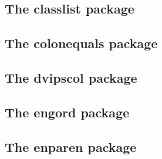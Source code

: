 \documentclass[a4paper,12pt]{article}
\makeatletter
\newcommand*{\xpackage}[1]{\textsf{#1}}
\newcommand*{\xfile}[1]{\texttt{#1}}
\newcommand*{\tocinclude}[1]{%
  \setcounter{tocdepth}{3}%
  \begingroup
    \makeatletter
    \def\@prj{#1}%
    \let\contentsline\foreign@contentsline
  \endgroup
}
\def\foreign@contentsline#1#2#3#4{%
  \ifx\\#4\\%
    \csname l@#1\endcsname{#2}{#3}%
  \else
    \ifHy@linktocpage
      \csname l@#1\endcsname{{#2}}{%
        \hyper@linkfile{#3}{\@prj.pdf}{#4}%
      }%
    \else
      \csname l@#1\endcsname{%
        \hyper@linkfile{#2}{\@prj.pdf}{#4}%
      }{#3}%
    \fi
  \fi
}%
\newcommand*{\pkgsectformat}[1]{%
  \texorpdfstring{%
    \textcolor{link}{The} %
    \xpackage{#1} %
    \textcolor{link}{package}%
  }{#1}%
}
\makeatother
\begin{document}
\newpage
\subsection{\pkgsectformat{classlist}}
\label{classlist}
\begin{abstract}
This package records the loaded classes and stores
them in a list.
\end{abstract}
\tocinclude{classlist}

\newpage
\subsection{\pkgsectformat{colonequals}}
\label{colonequals}
\begin{abstract}
Package \xpackage{colonequals} defines poor man's symbols
for math relation symbols such as ``colon equals''.
The colon is centered around the horizontal math axis.
\end{abstract}
\tocinclude{colonequals}

\newpage
\subsection{\pkgsectformat{dvipscol}}
\label{dvipscol}
\begin{abstract}
Color support for dvips in \xfile{dvips.def} involves the
color stack of dvips. The package tries to remove unnecessary
uses of the stack to avoid the error ``out of coor stack space''.
\end{abstract}
\tocinclude{dvipscol}


\newpage
\subsection{\pkgsectformat{engord}}
\label{engord}
\begin{abstract}
The package generates the suffix of English ordinal numbers.
It can be used with plain and \LaTeX\ formats.
\end{abstract}
\tocinclude{engord}

\newpage
\subsection{\pkgsectformat{enparen}}
\label{enparen}
\begin{abstract}
The package defines macros to set parentheses that automatically
change the symbols from inner to outer fences.
\end{abstract}
\tocinclude{enparen}
\end{document}
